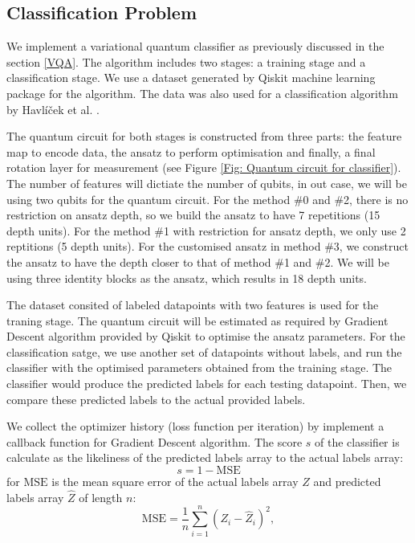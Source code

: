 \subsection{Classification Problem} \label{Sec: Classification Problem}
We implement a variational quantum classifier as previously discussed in the section \ref{VQA}.
The algorithm includes two stages: a training stage and a classification stage.
We use a dataset generated by Qiskit machine learning package for the algorithm.
The data was also used for a classification algorithm by Havlíček et al. \cite{havlicekSupervisedLearningQuantumenhanced2019}.

The quantum circuit for both stages is constructed from three parts: the feature map to encode data, the ansatz to perform optimisation and finally, a final rotation layer for measurement (see Figure \ref{Fig: Quantum circuit for classifier}).
The number of features will dictiate the number of qubits, in out case, we will be using two qubits for the quantum circuit.
For the method \#0 and \#2, there is no restriction on ansatz depth, so we build the ansatz to have 7 repetitions (15 depth units).
For the method \#1 with restriction for ansatz depth, we only use 2 reptitions (5 depth units).
For the customised ansatz in method \#3, we construct the ansatz to have the depth closer to that of method \#1 and \#2. We will be using three identity blocks as the ansatz, which results in 18 depth units.

The dataset consited of labeled datapoints with two features is used for the traning stage.
The quantum circuit will be estimated as required by Gradient Descent algorithm provided by Qiskit to optimise the ansatz parameters.
For the classification satge, we use another set of datapoints without labels, and run the classifier with the optimised parameters obtained from the training stage.
The classifier would produce the predicted labels for each testing datapoint.
Then, we compare these predicted labels to the actual provided labels.

We collect the optimizer history (loss function per iteration) by implement a callback function for Gradient Descent algorithm.
The score $s$ of the classifier is calculate as the likeliness of the predicted labels array to the actual labels array:
\begin{equation}
    s = 1 - \text{MSE}
\end{equation}
for $\text{MSE}$ is the mean square error of the actual labels array $Z$ and predicted labels array $\hat{Z}$ of length $n$:
\begin{equation}
    \text{MSE} = \frac{1}{n}\sum^n_{i=1}(Z_i - \hat{Z}_i)^2,
\end{equation}



